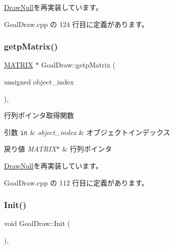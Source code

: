 \mbox{\hyperlink{class_draw_null_a0c1efe55fea325ad277594be6fe1e938}{Draw\+Null}}を再実装しています。



 Goal\+Draw.\+cpp の 124 行目に定義があります。

\mbox{\label{class_goal_draw_a536a23c043576f9032e6651d7644d038}} 
\subsubsection{\texorpdfstring{getp\+Matrix()}{getpMatrix()}}
{\footnotesize\ttfamily \mbox{\hyperlink{_vector3_d_8h_a032295cd9fb1b711757c90667278e744}{M\+A\+T\+R\+IX}} $\ast$ Goal\+Draw\+::getp\+Matrix (\begin{DoxyParamCaption}\item[{unsigned}]{object\+\_\+index }\end{DoxyParamCaption})\hspace{0.3cm}{\ttfamily [override]}, {\ttfamily [virtual]}}



行列ポインタ取得関数 


\begin{DoxyParams}[1]{引数}
\mbox{\tt in}  & {\em object\+\_\+index} & オブジェクトインデックス \\
\hline
\end{DoxyParams}

\begin{DoxyRetVals}{戻り値}
{\em M\+A\+T\+R\+I\+X$\ast$} & 行列ポインタ \\
\hline
\end{DoxyRetVals}


\mbox{\hyperlink{class_draw_null_a9aac059eb3b5d1f77e8bd3aa0647cff9}{Draw\+Null}}を再実装しています。



 Goal\+Draw.\+cpp の 112 行目に定義があります。

\mbox{\label{class_goal_draw_a3eb0a555fa2db9d2c1253018ea65796e}} 
\subsubsection{\texorpdfstring{Init()}{Init()}}
{\footnotesize\ttfamily void Goal\+Draw\+::\+Init (\begin{DoxyParamCaption}{ }\end{DoxyParamCaption})\hspace{0.3cm}{\ttfamily [override]}, {\ttfamily [virtual]}}



